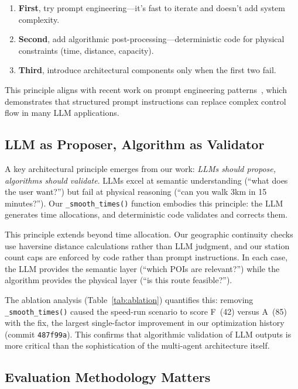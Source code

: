 \begin{enumerate}[leftmargin=*]
    \item \textbf{First}, try prompt engineering---it's fast to iterate and doesn't add system complexity.
    \item \textbf{Second}, add algorithmic post-processing---deterministic code for physical constraints (time, distance, capacity).
    \item \textbf{Third}, introduce architectural components only when the first two fail.
\end{enumerate}

This principle aligns with recent work on prompt engineering patterns~\cite{white2024prompt}, which demonstrates that structured prompt instructions can replace complex control flow in many LLM applications.

\subsection{LLM as Proposer, Algorithm as Validator}

A key architectural principle emerges from our work: \textit{LLMs should propose, algorithms should validate}. LLMs excel at semantic understanding (``what does the user want?'') but fail at physical reasoning (``can you walk 3km in 15 minutes?''). Our \texttt{\_smooth\_times()} function embodies this principle: the LLM generates time allocations, and deterministic code validates and corrects them.

This principle extends beyond time allocation. Our geographic continuity checks use haversine distance calculations rather than LLM judgment, and our station count caps are enforced by code rather than prompt instructions. In each case, the LLM provides the semantic layer (``which POIs are relevant?'') while the algorithm provides the physical layer (``is this route feasible?'').

The ablation analysis (Table~\ref{tab:ablation}) quantifies this: removing \texttt{\_smooth\_times()} caused the speed-run scenario to score F~(42) versus A~(85) with the fix, the largest single-factor improvement in our optimization history (commit \texttt{487f99a}). This confirms that algorithmic validation of LLM outputs is more critical than the sophistication of the multi-agent architecture itself.

\subsection{Evaluation Methodology Matters}

